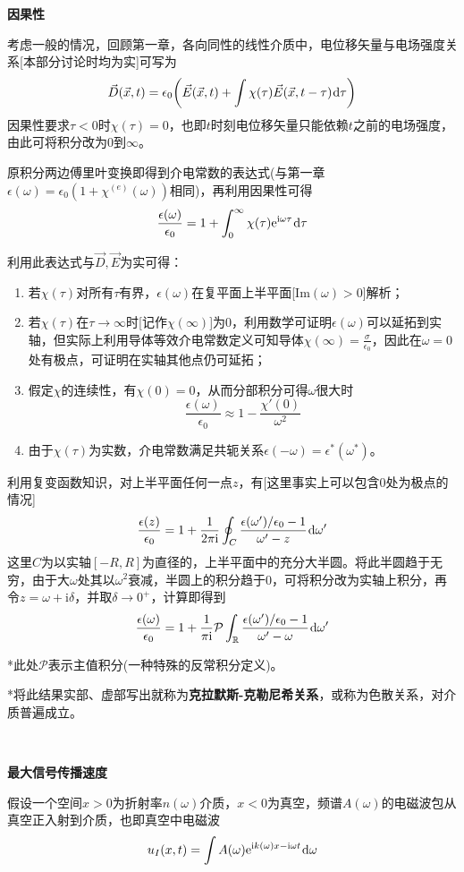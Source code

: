 \documentclass[a4paper,UTF8,fontset=windows]{ctexart}
\newcommand*{\dr}{\hspace{0.07em}\mathrm{d}}
\newcommand*{\er}{\mathrm{e}}
\newcommand*{\ir}{\mathrm{i}}
\newcommand*{\vd}{\vec{D}}
\newcommand*{\ve}{\vec{E}}
\newcommand*{\vx}{\vec{x}}
\begin{document}
\textbf{因果性}

考虑一般的情况，回顾第一章，各向同性的线性介质中，电位移矢量与电场强度关系[本部分讨论时均为实]可写为
$$\vd(\vx,t)=\epsilon_0\bigg(\ve(\vx,t)+\int\chi(\tau)\ve(\vx,t-\tau)\dr\tau\bigg)$$
因果性要求$\tau<0$时$\chi(\tau)=0$，也即$t$时刻电位移矢量只能依赖$t$之前的电场强度，由此可将积分改为0到$\infty$。

原积分两边傅里叶变换即得到介电常数的表达式(与第一章$\epsilon(\omega)=\epsilon_0(1+\chi^{(e)}(\omega))$相同)，再利用因果性可得
$$\frac{\epsilon(\omega)}{\epsilon_0}=1+\int_0^\infty\chi(\tau)\er^{\ir\omega\tau}\dr\tau$$

利用此表达式与$\vd,\ve$为实可得：
\begin{enumerate}
    \item 若$\chi(\tau)$对所有$\tau$有界，$\epsilon(\omega)$在复平面上半平面[$\mathrm{Im}(\omega)>0$]解析；
    \item 若$\chi(\tau)$在$\tau\to\infty$时[记作$\chi(\infty)$]为0，利用数学可证明$\epsilon(\omega)$可以延拓到实轴，但实际上利用导体等效介电常数定义可知导体$\chi(\infty)=\frac{\sigma}{\epsilon_0}$，因此在$\omega=0$处有极点，可证明在实轴其他点仍可延拓；
    \item 假定$\chi$的连续性，有$\chi(0)=0$，从而分部积分可得$\omega$很大时
        $$\frac{\epsilon(\omega)}{\epsilon_0}\approx 1-\frac{\chi'(0)}{\omega^2}$$
    \item 由于$\chi(\tau)$为实数，介电常数满足共轭关系$\epsilon(-\omega)=\epsilon^*(\omega^*)$。
\end{enumerate}

利用复变函数知识，对上半平面任何一点$z$，有[这里事实上可以包含0处为极点的情况]
$$\frac{\epsilon(z)}{\epsilon_0}=1+\frac{1}{2\pi\ir}\oint_C\frac{\epsilon(\omega')/\epsilon_0-1}{\omega'-z}\dr\omega'$$
这里$C$为以实轴$[-R,R]$为直径的，上半平面中的充分大半圆。将此半圆趋于无穷，由于大$\omega$处其以$\omega^2$衰减，半圆上的积分趋于0，可将积分改为实轴上积分，再令$z=\omega+\ir\delta$，并取$\delta\to0^+$，计算即得到
$$\frac{\epsilon(\omega)}{\epsilon_0}=1+\frac{1}{\pi\ir}\mathcal{P}\int_\mathbb{R}\frac{\epsilon(\omega')/\epsilon_0-1}{\omega'-\omega}\dr\omega'$$

*此处$\mathcal{P}$表示主值积分(一种特殊的反常积分定义)。

*将此结果实部、虚部写出就称为\textbf{克拉默斯-克勒尼希关系}，或称为色散关系，对介质普遍成立。

\

\textbf{最大信号传播速度}

假设一个空间$x>0$为折射率$n(\omega)$介质，$x<0$为真空，频谱$A(\omega)$的电磁波包从真空正入射到介质，也即真空中电磁波
$$u_I(x,t)=\int A(\omega)\er^{\ir k(\omega)x-\ir\omega t}\dr\omega$$
\end{document}

